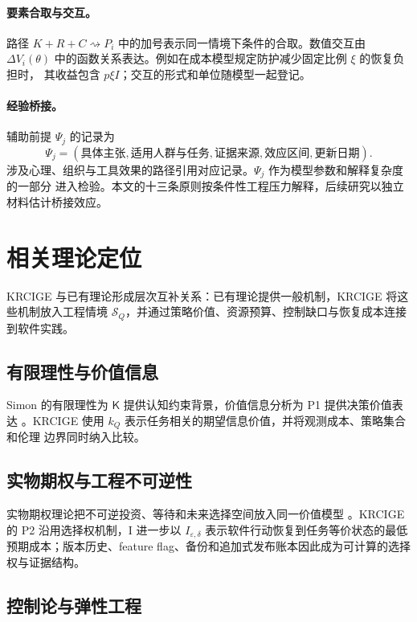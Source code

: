 \documentclass[11pt,a4paper]{ctexart}
\numberwithin{equation}{section}
\theoremstyle{definition}
\theoremstyle{plain}
\newcommand{\Know}{\mathsf{K}}
\begin{document}
\paragraph{要素合取与交互。}
路径 $K+R+C\rightsquigarrow P_i$ 中的加号表示同一情境下条件的合取。数值交互由
$\Delta V_i(\theta)$ 中的函数关系表达。例如在成本模型规定防护减少固定比例 $\xi$ 的恢复负担时，
其收益包含 $p\xi I$；交互的形式和单位随模型一起登记。

\paragraph{经验桥接。}
辅助前提 $\Psi_j$ 的记录为
\[
\Psi_j=(\text{具体主张},\text{适用人群与任务},\text{证据来源},\text{效应区间},\text{更新日期}).
\]
涉及心理、组织与工具效果的路径引用对应记录。$\Psi_j$ 作为模型参数和解释复杂度的一部分
进入检验。本文的十三条原则按条件性工程压力解释，后续研究以独立材料估计桥接效应。

\section{相关理论定位}

KRCIGE 与已有理论形成层次互补关系：已有理论提供一般机制，KRCIGE 将这些机制放入工程情境
$\mathcal{S}_Q$，并通过策略价值、资源预算、控制缺口与恢复成本连接到软件实践。

\subsection{有限理性与价值信息}

Simon 的有限理性为 $\Know$ 提供认知约束背景，价值信息分析为 P1 提供决策价值表达
\cite{simon1978}。KRCIGE 使用 $k_Q$ 表示任务相关的期望信息价值，并将观测成本、策略集合和伦理
边界同时纳入比较。

\subsection{实物期权与工程不可逆性}

实物期权理论把不可逆投资、等待和未来选择空间放入同一价值模型 \cite{dixit1994}。KRCIGE 的
P2 沿用选择权机制，I 进一步以 $I_{\varepsilon,\delta}$ 表示软件行动恢复到任务等价状态的最低
预期成本；版本历史、feature flag、备份和追加式发布账本因此成为可计算的选择权与证据结构。

\subsection{控制论与弹性工程}
\end{document}
